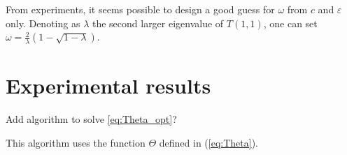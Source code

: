 \documentclass{article} %
\DeclareMathOperator{\IR}{\mathbb{R}}
\DeclareMathOperator{\Ccal}{\mathcal{C}}
\DeclareMathOperator{\diag}{diag}
\renewcommand{\epsilon}{\varepsilon}
\theoremstyle{plain}
\theoremstyle{definition}
\theoremstyle{remark}
\begin{document}
From experiments, it seems possible to design a good guess for $\omega$ from $c$ and $\epsilon$ only. 
    Denoting as $\lambda$ the second larger eigenvalue of $T(1,1)$, one can set 
    $\omega=\frac{2}{\lambda}(1-\sqrt{1-\lambda})$.
    
    
    
\section{Experimental results}



\renewcommand{\algorithmiccomment}[1]{\hfill\bgroup(#1)\egroup}
Add algorithm to solve \eqref{eq:Theta_opt}?

This algorithm uses the function $\Theta$ defined in (\ref{eq:Theta}).
\end{document}
